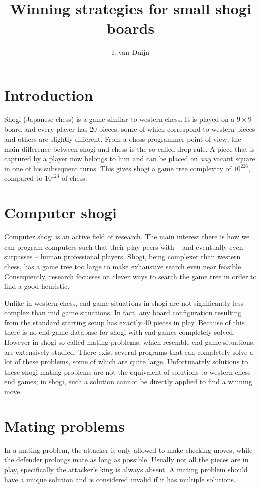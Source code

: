 \documentclass{paper}
\title{Winning strategies for small shogi boards}
\author{I. van Duijn}
\begin{document}
\maketitle
\section{Introduction}
Shogi (Japanese chess) is a game similar to western chess. It is played on a $9 \times 9$ board and every
player has 20 pieces, some of which correspond to western pieces and others are slightly different.
From a chess programmer point of view, the main difference between shogi and chess is the so called drop rule.
A piece that is captured by a player now belongs to him and can be placed on \textit{any} vacant square in one of his subsequent turns.
This gives shogi a game tree complexity of $10^{226}$, compared to $10^{123}$ of chess.

\section{Computer shogi}
Computer shogi is an active field of research. The main interest there is how we can program computers 
such that their play peers with -- and eventually even surpasses -- human professional players. Shogi, being complexer
than western chess, has a game tree too large to make exhaustive search even near feasible. Consequently, research
focusses on clever ways to search the game tree in order to find a good heuristic.

Unlike in western chess, end game situations
in shogi are not significantly less complex than mid game situations. In fact, any board configuration resulting from the standard
starting setup has exactly 40 pieces in play. Because of this there is no end game database for shogi with end games completely
solved. However in shogi so called mating problems, which resemble end game situations, are extensively studied. There exist several
programs that can completely solve a lot of these problems, some of which are quite large. Unfortunately solutions to these shogi mating problems
are not the equivalent of solutions to western chess end games; in shogi, such a solution cannot be directly applied to find a winning move.

\section{Mating problems}
In a mating problem, the attacker is only allowed to make checking moves, while the defender prolongs mate as long as possible.
Usually not all the pieces are in play, specifically the attacker's king is always absent. A mating problem should have a unique solution and
is considered invalid if it has multiple solutions.
\end{document}
